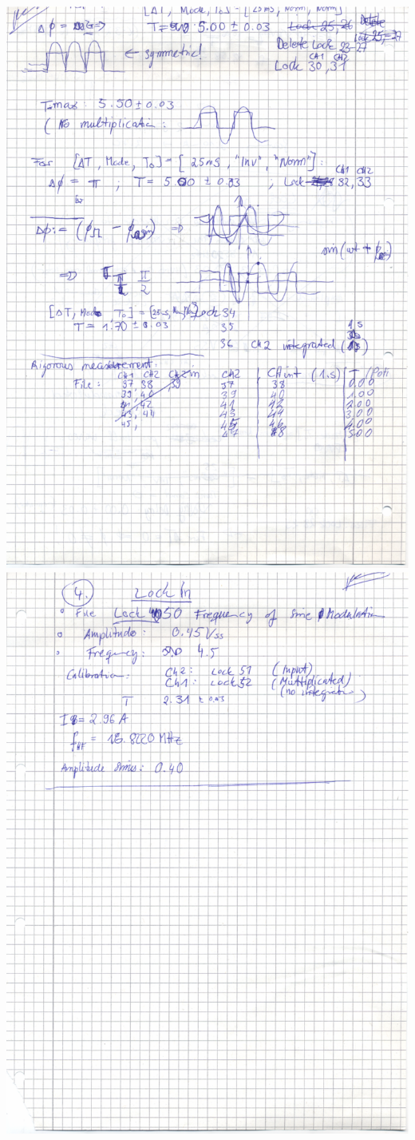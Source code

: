     \includegraphics[width=\linewidth]{appendix/spin7}
\clearpage
    \includegraphics[width=\linewidth]{appendix/spin8}
\clearpage

